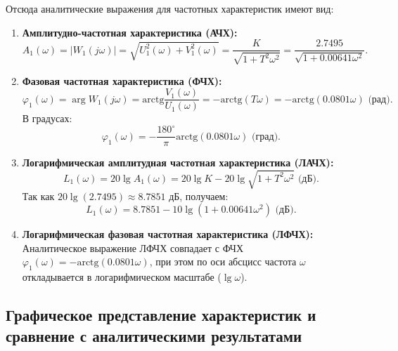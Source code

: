 \documentclass[12pt, a4paper]{article}
\begin{document}
Отсюда аналитические выражения для частотных характеристик имеют вид:
\begin{enumerate}
    \item \textbf{Амплитудно-частотная характеристика (АЧХ):}
    \begin{equation}
        A_1(\omega) = |W_1(j\omega)| = \sqrt{U_1^2(\omega) + V_1^2(\omega)} = \frac{K}{\sqrt{1 + T^2\omega^2}} = \frac{2.7495}{\sqrt{1 + 0.00641\omega^2}}.
    \end{equation}

    \item \textbf{Фазовая частотная характеристика (ФЧХ):}
    \begin{equation}
        \varphi_1(\omega) = \arg W_1(j\omega) = \text{arctg}\frac{V_1(\omega)}{U_1(\omega)} = -\text{arctg}(T\omega) = -\text{arctg}(0.0801\omega)\text{ (рад)}.
    \end{equation}
    В градусах:
    \begin{equation}
        \varphi_1(\omega) = -\frac{180^\circ}{\pi}\text{arctg}(0.0801\omega)\text{ (град)}.
    \end{equation}

    \item \textbf{Логарифмическая амплитудная частотная характеристика (ЛАЧХ):}
    \begin{equation}
        L_1(\omega) = 20\lg A_1(\omega) = 20\lg K - 20\lg\sqrt{1 + T^2\omega^2}\text{ (дБ)}.
    \end{equation}
    Так как $20\lg(2.7495) \approx 8.7851\text{ дБ}$, получаем:
    \begin{equation}
        L_1(\omega) = 8.7851 - 10\lg\left(1 + 0.00641\omega^2\right)\text{ (дБ)}.
    \end{equation}

    \item \textbf{Логарифмическая фазовая частотная характеристика (ЛФЧХ):} \\
    Аналитическое выражение ЛФЧХ совпадает с ФЧХ $\varphi_1(\omega) = -\text{arctg}(0.0801\omega)$, при этом по оси абсцисс частота $\omega$ откладывается в логарифмическом масштабе ($\lg\omega$).
\end{enumerate}

\subsection{Графическое представление характеристик и сравнение с аналитическими результатами}
\end{document}
